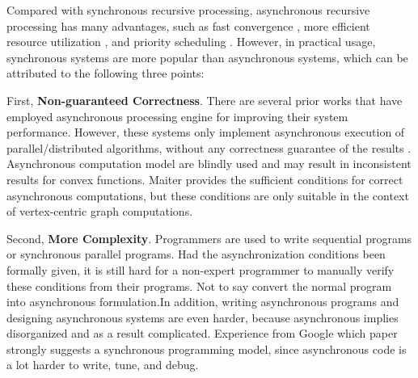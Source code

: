 Compared with synchronous recursive processing, asynchronous recursive processing has many advantages, such as fast convergence \cite{}, more efficient resource utilization \cite{}, and priority scheduling \cite{}. However, in practical usage, synchronous systems are more popular than asynchronous systems, which can be attributed to the following three points:


First, \textbf{Non-guaranteed Correctness}. There are several prior works that have employed asynchronous processing engine for improving their system performance. However, these systems only implement asynchronous execution of parallel/distributed algorithms, without any correctness guarantee of the results \cite{GRAPHLAB}. Asynchronous computation model are blindly used and may result in inconsistent results for convex functions. Maiter \cite{} provides the sufficient conditions for correct asynchronous computations, but these conditions are only suitable in the context of vertex-centric graph computations.

Second, \textbf{More Complexity}. Programmers are used to write sequential programs or synchronous parallel programs. Had the asynchronization conditions been formally given, it is still hard for a non-expert programmer to manually verify these conditions from their programs. Not to say convert the normal program into asynchronous formulation.In addition, writing asynchronous programs and designing asynchronous systems are even harder, because asynchronous implies disorganized and as a result complicated. Experience from Google \cite{}{\color{red}which paper} strongly suggests a synchronous programming model, since asynchronous code is a lot harder to write, tune, and debug.




